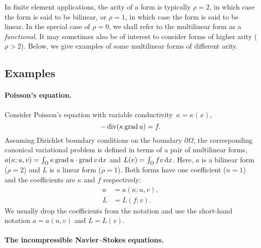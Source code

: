 In finite element applications, the arity of a form is typically $\rho
= 2$, in which case the form is said to be bilinear, or $\rho = 1$, in
which case the form is said to be linear. In the special case of $\rho
= 0$, we shall refer to the multilinear form as a
\emph{functional}. It may sometimes also be of interest to consider
forms of higher arity ($\rho > 2$). Below, we give examples of some
multilinear forms of different arity.

\subsection{Examples}

\paragraph{Poisson's equation.}

Consider Poisson's equation with variable conductivity~$\kappa =
\kappa(x)$,
\begin{equation}
  -\operatorname{div} (\kappa \operatorname{grad} u) = f.
\end{equation}
Assuming Dirichlet boundary conditions on the boundary
$\partial\Omega$, the corresponding canonical
variational problem is defined in terms of a pair of multilinear
forms, $a(\kappa; u, v) = \int_{\Omega} \kappa \operatorname{grad} u \cdot \operatorname{grad}
v \, \mathrm{d}x$ and $L(v) = \int_{\Omega} f v \, \mathrm{d}x$. Here, $a$ is a bilinear
form ($\rho = 2$) and $L$ is a linear form ($\rho = 1$). Both forms
have one coefficient ($n = 1$) and the coefficients are $\kappa$ and
$f$ respectively:
\begin{equation}
  \begin{split}
    a &= a(\kappa; u, v), \\
    L &= L(f; v).
  \end{split}
\end{equation}
We usually drop the coefficients from the notation and use the
short-hand notation $a = a(u, v)$ and $L = L(v)$.

\paragraph{The incompressible Navier--Stokes equations.}

